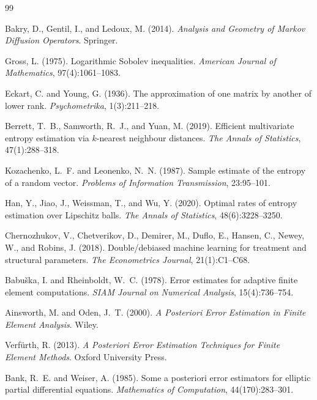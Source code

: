 \begin{thebibliography}{99}

Bakry, D., Gentil, I., and Ledoux, M. (2014).
\emph{Analysis and Geometry of Markov Diffusion Operators}.
Springer.

Gross, L. (1975).
Logarithmic Sobolev inequalities.
\emph{American Journal of Mathematics}, 97(4):1061--1083.

Eckart, C. and Young, G. (1936).
The approximation of one matrix by another of lower rank.
\emph{Psychometrika}, 1(3):211--218.

Berrett, T.~B., Samworth, R.~J., and Yuan, M. (2019).
Efficient multivariate entropy estimation via $k$-nearest neighbour distances.
\emph{The Annals of Statistics}, 47(1):288--318.

Kozachenko, L.~F. and Leonenko, N.~N. (1987).
Sample estimate of the entropy of a random vector.
\emph{Problems of Information Transmission}, 23:95--101.

Han, Y., Jiao, J., Weissman, T., and Wu, Y. (2020).
Optimal rates of entropy estimation over Lipschitz balls.
\emph{The Annals of Statistics}, 48(6):3228--3250.

Chernozhukov, V., Chetverikov, D., Demirer, M., Duflo, E., Hansen, C., Newey, W., and Robins, J. (2018).
Double/debiased machine learning for treatment and structural parameters.
\emph{The Econometrics Journal}, 21(1):C1--C68.

Babu\v{s}ka, I. and Rheinboldt, W.~C. (1978).
Error estimates for adaptive finite element computations.
\emph{SIAM Journal on Numerical Analysis}, 15(4):736--754.

Ainsworth, M. and Oden, J.~T. (2000).
\emph{A Posteriori Error Estimation in Finite Element Analysis}.
Wiley.

Verf\"urth, R. (2013).
\emph{A Posteriori Error Estimation Techniques for Finite Element Methods}.
Oxford University Press.

Bank, R.~E. and Weiser, A. (1985).
Some a posteriori error estimators for elliptic partial differential equations.
\emph{Mathematics of Computation}, 44(170):283--301.


\end{thebibliography}
